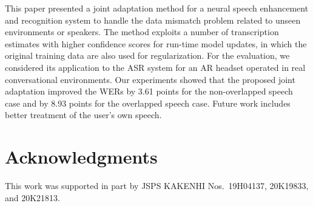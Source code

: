 \documentclass[a4paper]{article}
\begin{document}
This paper presented a joint adaptation method
 for a neural speech enhancement and recognition system
 to handle the data mismatch problem related to unseen environments or speakers.
The method exploits a number of transcription estimates 
 with higher confidence scores for run-time model updates,
 in which the original training data are also used for regularization.
For the evaluation, we considered its application
 to the ASR system for an AR headset 
 operated in real conversational environments.
Our experiments showed that
the proposed joint adaptation improved
the WERs by 3.61 points for the non-overlapped speech case
and by 8.93 points for the overlapped speech case.
Future work includes better treatment of the user's own speech.

\section{Acknowledgments}

This work was supported in part 
by JSPS KAKENHI Nos.~19H04137, 20K19833, and 20K21813.

\clearpage


\end{document}
